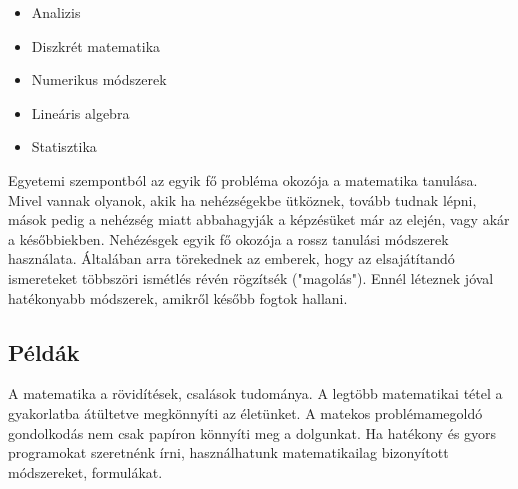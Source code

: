 \documentclass[../Main.tex]{subfiles}
\begin{document}
\begin{itemize}
    \item Analizis
    \item Diszkrét matematika
    \item Numerikus módszerek
    \item Lineáris algebra
    \item Statisztika
\end{itemize}

Egyetemi szempontból az egyik fő probléma okozója a matematika tanulása.
Mivel vannak olyanok, akik ha nehézségekbe ütköznek, tovább tudnak lépni,
mások pedig a nehézség miatt abbahagyják a képzésüket már az elején, vagy akár a későbbiekben.
Nehézésgek egyik fő okozója a rossz tanulási módszerek használata.
Általában arra törekednek az emberek, hogy az elsajátítandó ismereteket többszöri ismétlés
révén rögzítsék ("magolás"). Ennél léteznek jóval hatékonyabb módszerek, amikről később fogtok hallani.

\subsection{Példák}

A matematika a rövidítések, csalások tudománya.
A legtöbb matematikai tétel a gyakorlatba átültetve megkönnyíti az életünket.
A matekos problémamegoldó gondolkodás nem csak papíron könnyíti meg a dolgunkat.
Ha hatékony és gyors programokat szeretnénk írni, használhatunk matematikailag bizonyított módszereket, formulákat.
\end{document}
